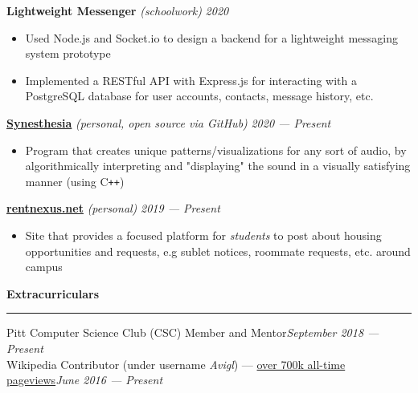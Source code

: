 \documentclass[10pt]{article}
\begin{document}
\begin{flushleft}
		\textbf{Lightweight Messenger} \textit{(schoolwork)} \hfill \textit{\small 2020}
		\vspace{-2mm}
		\begin{itemize}
			\item Used Node.js and Socket.io to design a backend for a lightweight messaging system prototype
			\vspace{-2mm}
			\item Implemented a RESTful API with Express.js for interacting with a PostgreSQL database for user accounts, contacts, message history, etc.
		\end{itemize}
		\vspace{-1.5mm}
		\textbf{\href{https://github.com/avigloz/synesthesia}{Synesthesia}} \textit{(personal, open source via GitHub)} \hfill \textit{\small 2020 --- Present}
		\vspace{-2mm}
		\begin{itemize}
			\item Program that creates unique patterns/visualizations for any sort of audio, by algorithmically interpreting and "displaying" the sound in a visually satisfying manner (using C\texttt{++})
		\end{itemize}
		\vspace{-1.5mm}
		\textbf{\href{https://rentnexus.net}{rentnexus.net}} \textit{(personal)} \hfill \textit{\small 2019 --- Present}
		\vspace{-2mm}
		\begin{itemize}
			\item Site that provides a focused platform for \textit{students} to post about housing opportunities and requests, e.g sublet notices, roommate requests, etc. around campus
		\end{itemize}

		\vspace{1.5mm}
		{\large \raggedright \textbf{Extracurriculars}}
		\vspace{1.25mm}
	
		\hrule
	
		\vspace{2.25mm}
		Pitt Computer Science Club (CSC) Member and Mentor\hfill \textit{\small September 2018 --- Present}\\
		Wikipedia Contributor (under username \textit{Avigl}) --- \href{https://pageviews.toolforge.org/?project=en.wikipedia.org&platform=all-access&agent=user&redirects=0&range=all-time&pages=Timeline_of_social_media|Timeline_of_online_advertising|Timeline_of_e-commerce|Screening_Partnership_Program|Silicon_Valley_Education_Foundation|Chicago_Community_Trust}{over 700k all-time pageviews}\hfill \textit{\small June 2016 --- Present}
		
	\end{flushleft}
\end{document}
